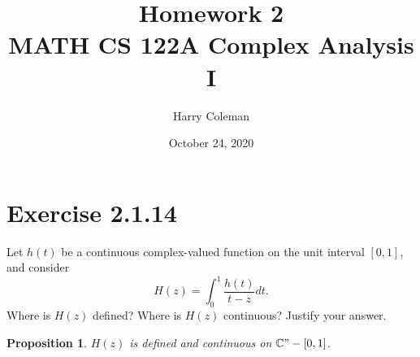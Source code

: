 \documentclass[12pt]{article}
\newtheorem{proposition}{Proposition}
\newenvironment{problem}
    {\begin{lrbox}{\mybox}\begin{minipage}{\textwidth-10pt}}
    {\end{minipage}\end{lrbox}\framebox[6.5in]{\usebox{\mybox}}}
\newcommand{\C}{\mathbb{C}}
\begin{document}
 
\title{Homework 2\\
    \large MATH CS 122A Complex Analysis I
}
\author{Harry Coleman}
\date{October 24, 2020}
\maketitle

\section*{Exercise 2.1.14}
\begin{problem}
    Let $h(t)$ be a continuous complex-valued function on the unit interval $[0,1]$, and consider
    \[H(z) = \int_0^1\frac{h(t)}{t-z}dt.\]
    Where is $H(z)$ defined? Where is $H(z)$ continuous? Justify your answer. 
\end{problem}

\begin{proposition}
    $H(z)$ is defined and continuous on $\C"-[0,1]$.
\end{proposition}
\end{document}
